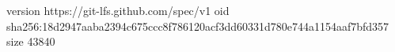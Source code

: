 version https://git-lfs.github.com/spec/v1
oid sha256:18d2947aaba2394c675ccc8f786120acf3dd60331d780e744a1154aaf7bfd357
size 43840
